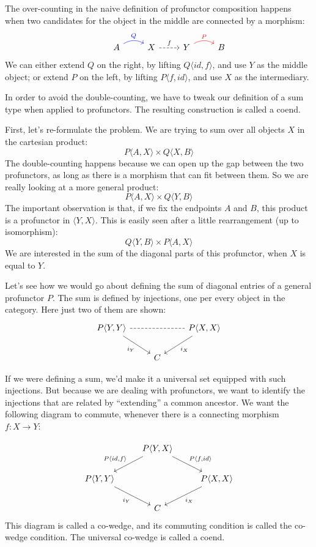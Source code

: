 \documentclass[DaoFP]{subfiles}
\begin{document}
The over-counting in the naive definition of profunctor composition happens when two candidates for the object in the middle are connected by a morphism:
\[
 \begin{tikzcd}
  & A
  \arrow[r, bend left, blue, "Q"]
  &X
  \arrow[r, dashed, "f"]
 & Y
  \arrow[r, bend left, red, "P"]
 & B
  \end{tikzcd}
\]
We can either extend $Q$ on the right, by lifting $Q \langle id, f \rangle$, and use $Y$ as the middle object; or extend $P$ on the left, by lifting $P \langle f, id \rangle$, and use $X$ as the intermediary.

In order to avoid the double-counting, we have to tweak our definition of a sum type when applied to profunctors. The resulting construction is called a coend. 

First, let's re-formulate the problem. We are trying to sum over all objects $X$ in the cartesian product:
\[ P \langle A, X \rangle \times Q \langle X, B \rangle \]
The double-counting happens because we can open up the gap between the two profunctors, as long as there is a morphism that can fit between them. So we are really looking at a more general product:
\[ P \langle A, X \rangle \times Q \langle Y, B \rangle \]
The important observation is that, if we fix the endpoints $A$ and $B$, this product is a profunctor in $\langle Y, X \rangle$. This is easily seen after a little rearrangement (up to isomorphism):
\[ Q \langle Y, B \rangle \times P \langle A, X \rangle \]
We are interested in the sum of the diagonal parts of this profunctor, when $X$ is equal to $Y$. 

Let's see how we would go about defining the sum of diagonal entries of a general profunctor $P$. The sum is defined by injections, one per every object in the category. Here just two of them are shown:
\[
 \begin{tikzcd}
 P \langle Y, Y \rangle
 \arrow[dr, "i_Y"']
 \arrow[rr, dash, dashed]
 &&P \langle X, X \rangle
 \arrow[dl, "i_X"]
 \\
 &C
 \end{tikzcd}
\]

If we were defining a sum, we'd make it a universal set equipped with such injections. But because we are dealing with profunctors, we want to identify the injections that are related by ``extending'' a common ancestor. We want the following diagram to commute, whenever there is a connecting morphism $f\colon X \to Y$:

\[
 \begin{tikzcd}
 &P \langle Y, X \rangle
 \arrow[ld, "{P \langle id, f \rangle}"']
 \arrow[rd, "{P \langle f, id \rangle}"]
 \\
 P \langle Y, Y \rangle
 \arrow[dr, "i_Y"']
 &&P \langle X, X \rangle
 \arrow[dl, "i_X"]
 \\
 &C
 \end{tikzcd}
\]
This diagram is called a co-wedge, and its commuting condition is called the co-wedge condition. The universal co-wedge is called a coend.
\end{document}
